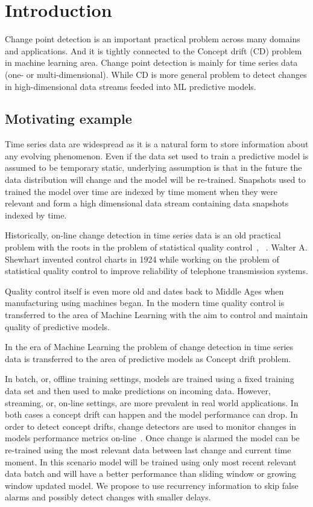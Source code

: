 \chapter{Introduction}

Change point detection is an important practical problem across many domains and applications.
And it is tightly connected to the Concept drift (CD) problem in machine learning area.
Change point detection is mainly for time series data (one- or multi-dimensional).
While CD is more general problem to detect changes in high-dimensional data streams feeded into ML predictive models.

\section{Motivating example} %
Time series data are widespread as it is a natural form to store information about any evolving phenomenon.
Even if the data set used to train a predictive model is assumed to be temporary static, underlying assumption is that in the future the data distribution will change and the model will be re-trained. Snapshots used to trained the model over time are indexed by time moment when they were relevant and form a high dimensional data stream containing data snapshots indexed by time.

Historically, on-line change detection in time series data is an old practical problem with the roots in the problem of statistical quality control~\cite{basseville1993detection}, ~\cite{NISTbook}. Walter A. Shewhart invented control charts in 1924 while working on the problem of statistical quality control to improve reliability of telephone transmission systems.

Quality control itself is even more old and dates back to Middle Ages when manufacturing using machines began.
In the modern time quality control is transferred to the area of Machine Learning with the aim to control and maintain quality of predictive models.

In the era of Machine Learning the problem of change detection in time series data is transferred to the area of predictive models as Concept drift problem.

In batch, or, offline training settings, models are trained using a fixed training data set and then used to make predictions on incoming data. 
However, streaming, or, on-line settings, are more prevalent in real world applications. 
In both cases a concept drift can happen and the model performance can drop. 
In order to detect concept drifts, change detectors are used to monitor changes in models performance metrics on-line~\cite{gama2004learning}. 
Once change is alarmed the model can be re-trained using the most relevant data between last change and current time moment.
In this scenario model will be trained using only most recent relevant data batch and will have a better performance than sliding window or growing window updated model.
We propose to use recurrency information to skip false alarms and possibly detect changes with smaller delays.

